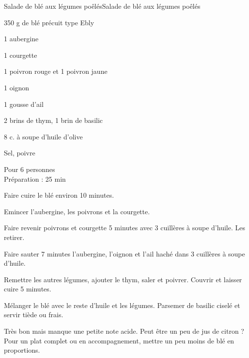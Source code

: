 \begin{recette}{Salade de blé aux légumes poêlés}{Salade de blé aux légumes poêlés}

\begin{ingredients}
350 g de blé précuit type Ebly\par
1 aubergine\par
1 courgette\par
1 poivron rouge et 1 poivron jaune\par
1 oignon\par
1 gousse d'ail\par
2 brins de thym, 1 brin de basilic\par
8 c. à soupe d'huile d'olive\par
Sel, poivre\par
\end{ingredients}

\begin{infos}
Pour 6 personnes\\
Préparation : 25 min\\
\end{infos}

\begin{etapes}
\item Faire cuire le blé environ 10 minutes.
\item Emincer l'aubergine, les poivrons et la courgette.
\item Faire revenir poivrons et courgette 5 minutes avec 3 cuillères à soupe d'huile. Les retirer.
\item Faire sauter 7 minutes l'aubergine, l'oignon et l'ail haché dans 3 cuillères à soupe d'huile.
\item Remettre les autres légumes, ajouter le thym, saler et poivrer. Couvrir et laisser cuire 5 minutes.
\item Mélanger le blé avec le reste d'huile et les légumes. Parsemer de basilic ciselé et servir tiède ou frais.
\end{etapes}

\begin{conseils}
Très bon mais manque une petite note acide. Peut être un peu de jus de citron ?
Pour un plat complet ou en accompagnement, mettre un peu moins de blé en proportions.
\end{conseils}

\end{recette}